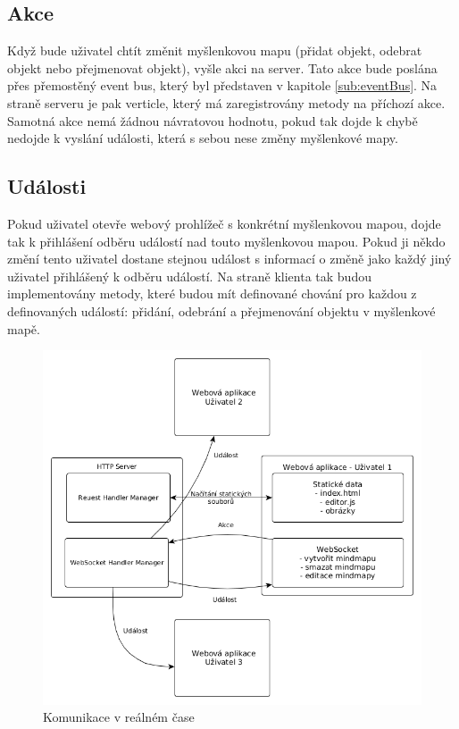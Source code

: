 \subsection{Akce}

Když bude uživatel chtít změnit myšlenkovou mapu (přidat objekt, odebrat objekt nebo přejmenovat objekt), vyšle akci na server. Tato akce bude poslána přes přemostěný event bus, který byl představen v kapitole \ref{sub:eventBus}. Na straně serveru je pak verticle, který má zaregistrovány metody na příchozí akce. Samotná akce nemá žádnou návratovou hodnotu, pokud tak dojde k chybě nedojde k vyslání události, která s sebou nese změny myšlenkové mapy.

\subsection{Události}

Pokud uživatel otevře webový prohlížeč s konkrétní myšlenkovou mapou, dojde tak k přihlášení odběru událostí nad touto myšlenkovou mapou. Pokud ji někdo změní tento uživatel dostane stejnou událost s informací o změně jako každý jiný uživatel přihlášený k odběru událostí.
Na straně klienta tak budou implementovány metody, které budou mít definované chování pro každou z definovaných událostí: přidání, odebrání a přejmenování objektu v myšlenkové mapě.

\begin{figure}
\begin{centering}
\includegraphics[width	=1\textwidth]{obrazky/realtime_communication}
\par\end{centering}
\caption{Komunikace v reálném čase\label{fig:realtime_communication}}
\end{figure}

